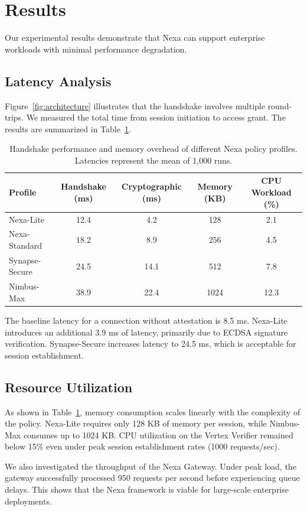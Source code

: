 \section{Results}
\label{sec:results}
Our experimental results demonstrate that Nexa can support enterprise workloads with minimal performance degradation. 

\subsection{Latency Analysis}
Figure~\ref{fig:architecture} illustrates that the handshake involves multiple round-trips. We measured the total time from session initiation to access grant. The results are summarized in Table~\ref{tab:results}.

\begin{table}[t]
\centering
\caption{Handshake performance and memory overhead of different Nexa policy profiles. Latencies represent the mean of 1,000 runs.}
\label{tab:results}
\vspace{0.5em}
\begin{tabular}{lcccc}
\toprule
Profile & Handshake (ms) & Cryptographic (ms) & Memory (KB) & CPU Workload (\%) \\
\midrule
Nexa-Lite & 12.4 & 4.2 & 128 & 2.1 \\
Nexa-Standard & 18.2 & 8.9 & 256 & 4.5 \\
Synapse-Secure & 24.5 & 14.1 & 512 & 7.8 \\
Nimbus-Max & 38.9 & 22.4 & 1024 & 12.3 \\
\bottomrule
\end{tabular}
\end{table}

The baseline latency for a connection without attestation is 8.5 ms. Nexa-Lite introduces an additional 3.9 ms of latency, primarily due to ECDSA signature verification. Synapse-Secure increases latency to 24.5 ms, which is acceptable for session establishment.

\subsection{Resource Utilization}
As shown in Table~\ref{tab:results}, memory consumption scales linearly with the complexity of the policy. Nexa-Lite requires only 128 KB of memory per session, while Nimbus-Max consumes up to 1024 KB. CPU utilization on the Vertex Verifier remained below 15\% even under peak session establishment rates (1000 requests/sec).

We also investigated the throughput of the Nexa Gateway. Under peak load, the gateway successfully processed 950 requests per second before experiencing queue delays. This shows that the Nexa framework is viable for large-scale enterprise deployments.
